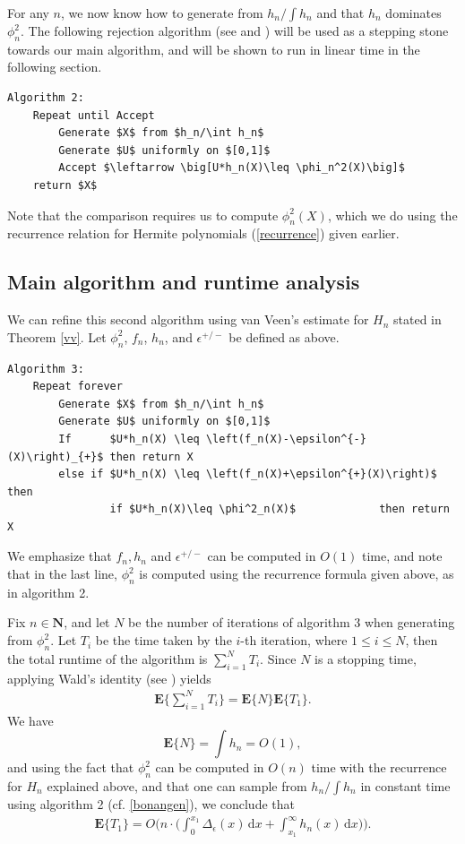 \documentclass[10pt]{article}
\theoremstyle{definition}
\theoremstyle{remark}
\newcommand{\E}{\mathbb{E}}
\newcommand{\1}{\mathbbm{1}}
\newcommand{\0}{\mathbbm{0}}
\renewcommand{\mathbb}{\mathbf}
\begin{document}
For any $n$, we now know how to generate from $h_n/\int h_n$ and that $h_n$ dominates $\phi_n^2$. The following rejection algorithm (see \cite{rng} and \cite{vonneumann}) will be used as a stepping stone towards our main algorithm, and will be shown to run in linear time in the following section.
\begin{lstlisting}
Algorithm 2:
    Repeat until Accept
        Generate $X$ from $h_n/\int h_n$
        Generate $U$ uniformly on $[0,1]$
        Accept $\leftarrow \big[U*h_n(X)\leq \phi_n^2(X)\big]$         
    return $X$
\end{lstlisting}
Note that the comparison requires us to compute $\phi_n^2(X)$, which we do using the recurrence relation for Hermite polynomials (\ref{recurrence}) given earlier.
\subsection{Main algorithm and runtime analysis}\label{bonanvvalg}

We can refine this second algorithm using van Veen's estimate for $H_n$ stated in Theorem \ref{vv}. Let $\phi_n^2$, $f_n$, $h_n$, and $\epsilon^{+/-}$ be defined as above. 


\begin{lstlisting}
Algorithm 3:
    Repeat forever
        Generate $X$ from $h_n/\int h_n$
        Generate $U$ uniformly on $[0,1]$
        If      $U*h_n(X) \leq \left(f_n(X)-\epsilon^{-}(X)\right)_{+}$ then return X
        else if $U*h_n(X) \leq \left(f_n(X)+\epsilon^{+}(X)\right)$ then
                if $U*h_n(X)\leq \phi^2_n(X)$             then return X
\end{lstlisting}
We emphasize that $f_n, h_n$ and $\epsilon^{+/-}$ can be computed in $O(1)$ time, and note that in the last line, $\phi_n^2$ is computed using the recurrence formula given above, as in algorithm 2.


Fix $n\in \mathbb{N}$, and let $N$ be the number of iterations of algorithm 3 when generating from $\phi_n^2$. Let $T_i$ be the time taken by the $i$-th iteration, where $1\leq i\leq N$, then the total runtime of the algorithm is $\sum_{i=1}^N T_i$. Since $N$ is a stopping time, applying Wald's identity (see \cite{williams}) yields
\begin{align*}
    \E\bigg\{\sum_{i=1}^NT_i\bigg\}=\E\{N\}\E\{T_1\}.
\end{align*}
We have
\[
    \E\{N\} = \int h_n = O(1),
\]
and using the fact that $\phi_n^2$ can be computed in $O(n)$ time with the recurrence for $H_n$ explained above, and that one can sample from $h_n/\int h_n$ in constant time using algorithm 2 (cf. \ref{bonangen}), we conclude that
\begin{align*}
    \E\{T_1\}= O\Bigg(n\cdot\bigg(\int_{0}^{x_1}\Delta_\epsilon(x)\,\mathrm{d}x+\int_{x_1}^{\infty}h_n(x)\,\mathrm{d}x\bigg)\Bigg).
\end{align*}
\end{document}
